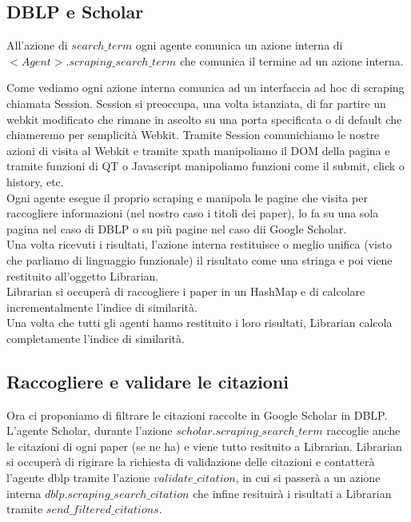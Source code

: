 \documentclass[12pt]{article}
\begin{document}
\subsection{DBLP e Scholar}
All'azione di $search\_term$ ogni agente comunica un azione interna di $<Agent>.scraping\_search\_term$ che comunica il termine ad un azione interna.




Come vediamo ogni azione interna comunica ad un interfaccia ad hoc di scraping chiamata Session. Session si preoccupa, una volta istanziata, di far partire un webkit modificato che rimane in ascolto su una porta specificata o di default che chiameremo per semplicit\`a Webkit. Tramite Session comunichiamo le nostre azioni di visita al Webkit e tramite xpath manipoliamo il DOM della pagina e tramite funzioni di QT o Javascript manipoliamo funzioni come il submit, click o history, etc. \\
Ogni agente esegue il proprio scraping e manipola le pagine che visita per raccogliere informazioni (nel nostro caso i titoli dei paper), lo fa su una sola pagina nel caso di DBLP o su pi\`u pagine nel caso dii Google Scholar.\\
Una volta ricevuti i risultati, l'azione interna restituisce o meglio unifica (visto che parliamo di linguaggio funzionale) il risultato come una stringa e poi viene restituito all'oggetto Librarian. \\
Librarian si occuper\`a di raccogliere i paper in un HashMap e di calcolare incrementalmente l'indice di similarit\`a. \\
Una volta che tutti gli agenti hanno restituito i loro risultati, Librarian calcola completamente l'indice di similarit\`a.

\subsection{Raccogliere e validare le citazioni}
Ora ci proponiamo di filtrare le citazioni raccolte in Google Scholar in DBLP. L'agente Scholar, durante l'azione $scholar.scraping\_search\_term$ raccoglie anche le citazioni di ogni paper (se ne ha) e viene tutto resituito a Librarian. Librarian si occuper\`a di rigirare la richiesta di validazione delle citazioni e contatter\`a l'agente dblp tramite l'azione $validate\_citation$, in cui si passer\`a a un azione interna $dblp.scraping\_search\_citation$ che infine resituir\`a i risultati a Librarian tramite $send\_filtered\_citations$.

\end{document}
